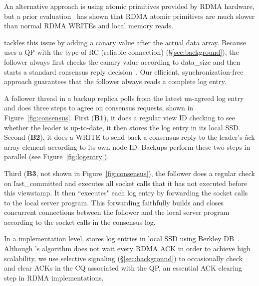 An alternative approach is using atomic primitives provided by RDMA hardware, 
but a prior evaluation~\cite{drtm:sosp15} has shown that RDMA atomic 
primitives are much slower than normal RDMA WRITEs and local memory reads.

\xxx tackles this issue by adding a canary value after the actual \v{data} 
array. Because \xxx uses a QP with the type of RC (reliable connection) 
(\S\ref{sec:background}), the follower always first checks the canary value 
according to \v{data\_size} and then starts a standard \paxos consensus reply 
decision~\cite{paxos:practical}. Our efficient, synchronization-free approach 
guarantees that the follower always reads a complete log entry.
% 

A follower thread in a backup replica polls from the latest un-agreed log 
entry and does three steps to agree on consensus requests, shown in 
Figure~\ref{fig:consensus}. First (\textbf{B1}), it does a regular \paxos view 
ID checking to see whether the leader is up-to-date, it then stores the log 
entry in its local SSD. Second (\textbf{B2}), it does a WRITE to send back 
a consensus reply to the leader's \v{ack} array element according to its 
own node ID. Backups perform these two steps in parallel 
(see Figure~\ref{fig:logentry}).

Third (\textbf{B3}, not shown in Figure~\ref{fig:consensus}), the follower 
does a regular \paxos check on \v{last\_committed} and executes all socket 
calls that it has not executed before this viewstamp. It then ``executes" each 
log entry by forwarding the socket calls to the local server program. This 
forwarding faithfully builds and closes concurrent connections between the 
follower and the local server program according to the socket calls in the 
consensus log.


In a implementation level, \xxx stores log entries in local SSD using Berkley 
DB~\cite{berkeleydb}. Although \xxx's algorithm does not wait every RDMA ACK in 
order to achieve high scalability, we use selective signaling 
(\S\ref{sec:background}) to occasionally check and clear ACKs in the CQ 
associated with the QP, an essential ACK clearing step in RDMA implementations.

